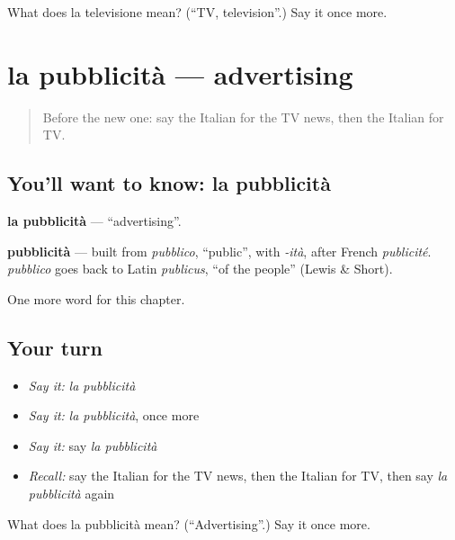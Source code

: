 \begin{tcolorbox}[breakable,colback=teal!4,colframe=teal!35!black,title={Before you move on}]
What does la televisione mean? (\textquotedblleft{}TV, television\textquotedblright{}.) Say it once more.
\end{tcolorbox}
\section[la pubblicità]{la pubblicità — advertising}

\label{lesson:IT-C249-pubblicita}



\begin{quote}
Before the new one: say the Italian for the TV news, then the Italian for TV.
\end{quote}

\subsection*{You'll want to know: la pubblicità}
\textbf{la pubblicità} — \textquotedblleft{}advertising\textquotedblright{}.

\begin{cousinweb}
\textbf{pubblicità} — built from \emph{pubblico}, \textquotedblleft{}public\textquotedblright{}, with \emph{-ità}, after French \emph{publicité}. \emph{pubblico} goes back to Latin \emph{publicus}, \textquotedblleft{}of the people\textquotedblright{} (Lewis \& Short).
\end{cousinweb}

\begin{grammarlens}[title={What you've built}]
One more word for this chapter.
\end{grammarlens}

\subsection*{Your turn}
\begin{itemize}
\raggedright
  \item \emph{Say it:} \emph{la pubblicità}
  \item \emph{Say it:} \emph{la pubblicità}, once more
  \item \emph{Say it:} say \emph{la pubblicità}
  \item \emph{Recall:} say the Italian for the TV news, then the Italian for TV, then say \emph{la pubblicità} again
\end{itemize}

\begin{tcolorbox}[breakable,colback=teal!4,colframe=teal!35!black,title={Before you move on}]
What does la pubblicità mean? (\textquotedblleft{}Advertising\textquotedblright{}.) Say it once more.
\end{tcolorbox}
